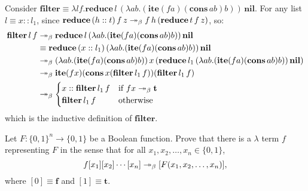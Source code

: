 \documentclass{homework}
\begin{document}
\begin{solution}
Consider $\mathbf{filter} \equiv \lambda lf.\mathbf{reduce}\,l\,(\lambda ab.(\mathbf{ite}(fa)(\mathbf{cons}\,ab)b))\,\mathbf{nil}$. For any list $l\equiv x::l_1$, since $\mathbf{reduce}\,(h::t)\,f\,z \twoheadrightarrow_{\beta} f\,h\,(\mathbf{reduce}\,t\,f\,z)$, so:
\begin{align*}
  \mathbf{filter}\,l\,f &\twoheadrightarrow_{\beta} \mathbf{reduce}\,l\,(\lambda ab.(\mathbf{ite}(fa)(\mathbf{cons}\,ab)b))\,\mathbf{nil}\\&\equiv\mathbf{reduce}\,(x::l_1)\,(\lambda ab.(\mathbf{ite}(fa)(\mathbf{cons}\,ab)b))\,\mathbf{nil}\\&\twoheadrightarrow_{\beta}(\lambda ab.(\mathbf{ite}(fa)(\mathbf{cons}\,ab)b))\,x\,(\mathbf{reduce}\,l_1\,(\lambda ab.(\mathbf{ite}(fa)(\mathbf{cons}\,ab)b))\,\mathbf{nil})\\&\twoheadrightarrow_{\beta}\mathbf{ite}(fx)(\mathbf{cons}\,x(\mathbf{filter}\,l_1\,f))(\mathbf{filter}\,l_1\,f)\\&\twoheadrightarrow_{\beta}\begin{cases}
    x::\mathbf{filter}\,l_1\,f & \text{if } fx\twoheadrightarrow_{\beta} \mathbf{t}\\
    \mathbf{filter}\,l_1\,f & \text{otherwise}
  \end{cases}
\end{align*}
which is the inductive definition of $\mathbf{filter}$.
\end{solution}

\begin{problem}
  Let $F : {\{0,1\}}^{n} \to \{0,1\}$ be a Boolean function.
  Prove that there is a $\lambda$ term $f$ representing $F$ in the sense that
  for all $x_{1}, x_{2}, \ldots, x_{n} \in \{0,1\}$,
  \begin{equation*}
    f [x_{1}] [x_{2}] \cdots [x_{n}] \twoheadrightarrow_{\beta} [F(x_{1}, x_{2}, \ldots, x_{n})],
  \end{equation*}
  where $[0] \equiv \mathbf{f}$ and $[1] \equiv \mathbf{t}$.
\end{problem}
\end{document}
